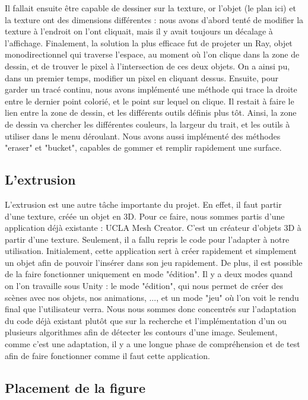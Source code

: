 \documentclass[a4paper,11pt]{article}
\begin{document}
			Il fallait ensuite être capable de dessiner sur la texture, or l'objet (le plan ici) et la texture ont des dimensions différentes : nous avons d'abord tenté de modifier la texture à l'endroit on l'ont cliquait, mais il y avait toujours un décalage à l'affichage. Finalement, la solution la plus efficace fut de projeter un Ray, objet monodirectionnel qui traverse l'espace, au moment où l'on clique dans la zone de dessin, et de trouver le pixel à l'intersection de ces deux objets. On a ainsi pu, dans un premier temps, modifier un pixel en cliquant dessus. Ensuite, pour garder un tracé continu, nous avons implémenté une méthode qui trace la droite entre le dernier point colorié, et le point sur lequel on clique. Il restait à faire le lien entre la zone de dessin, et les différents outils définis plus tôt. Ainsi, la zone de dessin va chercher les différentes couleurs, la largeur du trait, et les outils à utiliser dans le menu déroulant. Nous avons aussi implémenté des méthodes "eraser" et "bucket", capables de gommer et remplir rapidement une surface.
		\subsection{L'extrusion}
		
		L'extrusion est une autre tâche importante du projet. En effet, il faut partir d'une texture, créée un objet en 3D. Pour ce faire, nous sommes partis d'une application déjà existante : UCLA Mesh Creator. C'est un créateur d'objets 3D à partir d'une texture. Seulement, il a fallu repris le code pour l'adapter à notre utilisation. Initialement, cette application sert à créer rapidement et simplement un objet afin de pouvoir l'insérer dans son jeu rapidement. De plus, il est possible de la faire fonctionner uniquement en mode "édition". Il y a deux modes quand on l'on travaille sous Unity : le mode "édition", qui nous permet de créer des scènes avec nos objets, nos animations, ..., et un mode "jeu" où l'on voit le rendu final que l'utilisateur verra. Nous nous sommes donc concentrés sur l'adaptation du code déjà existant plutôt que sur la recherche et l'implémentation d'un ou plusieurs algorithmes afin de détecter les contours d'une image. Seulement, comme c'est une adaptation, il y a une longue phase de compréhension et de test afin de faire fonctionner comme il faut cette application. 
		\subsection{Placement de la figure}
		
\end{document}
